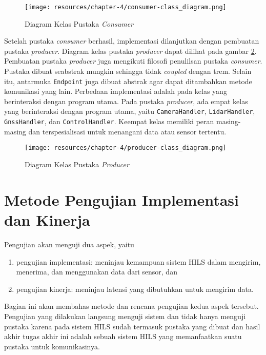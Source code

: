 \begin{figure}[h!]
	\centering
	\texttt{[image: resources/chapter-4/consumer-class\_diagram.png]}
	\caption{Diagram Kelas Pustaka \textit{Consumer}}
	\label{chapter-4-consumer-class-diagram}
\end{figure}

Setelah pustaka \textit{consumer} berhasil, implementasi dilanjutkan dengan
pembuatan pustaka \textit{producer}. Diagram kelas pustaka \textit{producer}
dapat dilihat pada gambar \ref{chapter-4-producer-class-diagram}. Pembuatan
pustaka \textit{producer} juga mengikuti filosofi penulilsan pustaka
\textit{consumer}. Pustaka dibuat seabstrak mungkin sehingga tidak
\textit{coupled} dengan trem. Selain itu, antarmuka \texttt{Endpoint} juga
dibuat abstrak agar dapat ditambahkan metode komunikasi yang lain. Perbedaan
implementasi adalah pada kelas yang berinteraksi dengan program utama. Pada
pustaka \textit{producer}, ada empat kelas yang berinteraksi dengan program
utama, yaitu \texttt{CameraHandler}, \texttt{LidarHandler},
\texttt{GnssHandler}, dan \texttt{ControlHandler}. Keempat kelas memiliki peran
masing-masing dan terspesialisasi untuk menangani data atau sensor tertentu.

\begin{figure}[h!]
	\centering
	\texttt{[image: resources/chapter-4/producer-class\_diagram.png]}
	\caption{Diagram Kelas Pustaka \textit{Producer}}
	\label{chapter-4-producer-class-diagram}
\end{figure}

\section{Metode Pengujian Implementasi dan Kinerja}

Pengujian akan menguji dua aspek, yaitu
\begin{enumerate}
	\item pengujian implementasi: meninjau kemampuan sistem HILS dalam mengirim,
	      menerima, dan menggunakan data dari sensor, dan
	\item pengujian kinerja: meninjau latensi yang dibutuhkan untuk mengirim
	      data.
\end{enumerate}
Bagian ini akan membahas metode dan rencana pengujian kedua aspek tersebut.
Pengujian yang dilakukan langsung menguji sistem dan tidak hanya menguji pustaka
karena pada sistem HILS sudah termasuk pustaka yang dibuat dan hasil akhir
tugas akhir ini adalah sebuah sistem HILS yang memanfaatkan suatu pustaka untuk
komunikasinya.

